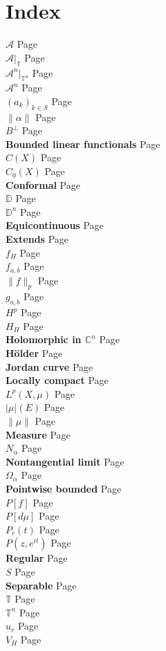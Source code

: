 \documentclass[a4paper,12pt,twoside,BCOR=10mm]{scrbook}
\theoremstyle{definition}
\theoremstyle{definition}
\theoremstyle{definition}
\begin{document}
\chapter*{Index}
\newcommand{\indexitem}[2]
{
{\bfseries #1} \hfill Page \pageref{#2}\\
}
\indexitem{$\mathcal{A}$}{index4}
\indexitem{$\mathcal{A}|_{\mathbb{T}}$}{index17}
\indexitem{$\mathcal{A}^n|_{\mathbb{T}^n}$}{index9}
\indexitem{$\mathcal{A}^n$}{index9}
\indexitem{$(a_k)_{k \in S}$}{index19}
\indexitem{$\|\alpha\|$}{index13}
%
\indexitem{$B^{\bot}$}{annilatingmeasure}
\indexitem{Bounded linear functionals}{index13}
%
\indexitem{$C(X)$}{index11}
\indexitem{$C_0(X)$}{index12}
\indexitem{Conformal}{index6}
%
\indexitem{$\mathbb{D}$}{index5}
\indexitem{$\mathbb{D}^n$}{index9}
%
\indexitem{Equicontinuous}{index18}
\indexitem{Extends}{index8}
%
\indexitem{$f_H$}{index29}
\indexitem{$f_{a, b}$}{index30}
\indexitem{$\|f\|_p$}{index15}
%
\indexitem{$g_{a, b}$}{index31}
%
\indexitem{$H^p$}{index24}
\indexitem{$H_H$}{index28}
\indexitem{Holomorphic in $\mathbb{C}^n$}{index9}
\indexitem{Hölder}{index16}
%
\indexitem{Jordan curve}{index7}
%
\indexitem{Locally compact}{index10}
\indexitem{$L^p(X, \mu)$}{index14}
%
\indexitem{$|\mu|(E)$}{index2}
\indexitem{$\|\mu\|$}{index3}
\indexitem{Measure}{index1}
%
\indexitem{$N_{\alpha}$}{index25}
\indexitem{Nontangential limit}{index25}
%
\indexitem{$\Omega_{\alpha}$}{index25}
%
\indexitem{Pointwise bounded}{index18}
\indexitem{$P[f]$}{index21}
\indexitem{$P[d\mu]$}{index21}
\indexitem{$P_r(t)$}{index21}
\indexitem{$P(z, e^{it})$}{index21}
%
\indexitem{Regular}{index20}
%
\indexitem{$S$}{index26}
\indexitem{Separable}{index23}
%
\indexitem{$\mathbb{T}$}{index5}
\indexitem{$\mathbb{T}^n$}{index9}
%
\indexitem{$u_r$}{index22}
%
\indexitem{$V_H$}{index28}



\end{document}
